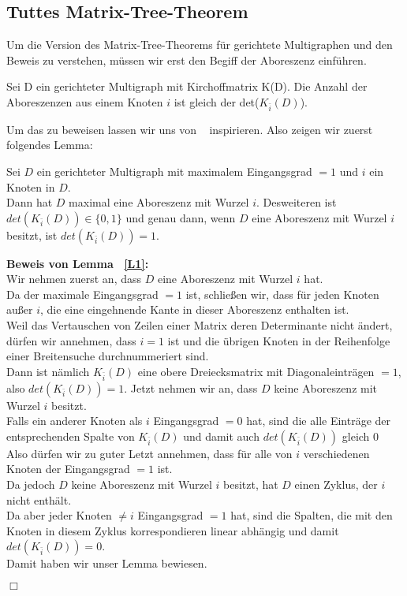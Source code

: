 \subsection{Tuttes Matrix-Tree-Theorem}
Um die Version des Matrix-Tree-Theorems für gerichtete Multigraphen und den Beweis zu verstehen, müssen wir erst den Begiff der Aboreszenz einführen.
\begin{Tms}
Sei D ein gerichteter Multigraph mit Kirchoffmatrix K(D). Die Anzahl der Aboreszenzen aus einem Knoten $i$ ist gleich der det($K_{\bar{i}}(D)$).
\end{Tms}
Um das zu beweisen lassen wir uns von ~\cite{bang-jensen_2009} inspirieren.
Also zeigen wir zuerst folgendes Lemma:
\begin{Lms}
Sei $D$ ein gerichteter Multigraph mit maximalem Eingangsgrad $=1$ und $i$ ein Knoten in $D$.\\
Dann hat $D$ maximal eine Aboreszenz mit Wurzel $i$. Desweiteren ist $det(K_{\bar{i}}(D)) \in \{0,1\}$
und genau dann, wenn $D$ eine Aboreszenz mit Wurzel $i$ besitzt, ist $det(K_{\bar{i}}(D)) = 1$.
\label{L1}
\end{Lms}
\textbf{Beweis von Lemma ~\ref{L1}:}\\
Wir nehmen zuerst an, dass $D$ eine Aboreszenz mit Wurzel $i$ hat.\\
Da der maximale Eingangsgrad $=1$ ist, schließen wir, dass für jeden Knoten außer $i$, die eine eingehnende Kante in dieser Aboreszenz enthalten ist. \\
Weil das Vertauschen von Zeilen einer Matrix deren Determinante nicht ändert, dürfen wir annehmen, dass $i=1$ ist und die übrigen Knoten in der Reihenfolge einer Breitensuche durchnummeriert sind.\\ 
Dann ist nämlich $K_{\bar{i}}(D)$ eine obere Dreiecksmatrix mit Diagonaleinträgen $=1$, also $det(K_{\bar{i}}(D)) = 1$.
Jetzt nehmen wir an, dass $D$ keine Aboreszenz mit Wurzel $i$ besitzt.\\
Falls ein anderer Knoten als $i$ Eingangsgrad $=0$ hat, sind die alle Einträge der entsprechenden Spalte von $K_{\bar{i}}(D)$ und damit auch $det(K_{\bar{i}}(D))$ gleich $0$\\
Also dürfen wir zu guter Letzt annehmen, dass für alle von $i$ verschiedenen Knoten der Eingangsgrad $=1$ ist.\\
Da jedoch $D$ keine Aboreszenz mit Wurzel $i$ besitzt, hat $D$ einen Zyklus, der $i$ nicht enthält.\\
Da aber jeder Knoten $\neq i$ Eingangsgrad $=1$ hat, sind die Spalten, die mit den Knoten in diesem Zyklus korrespondieren linear abhängig und damit $det(K_{\bar{i}}(D)) = 0$.\\
Damit haben wir unser Lemma bewiesen.
\begin{flushright} $\Box$ \end{flushright} 

